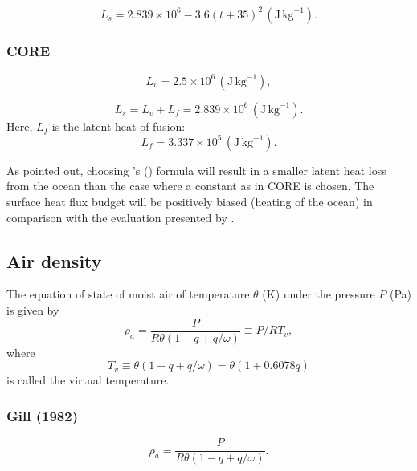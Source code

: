 \documentclass[dvipdfmx]{elsarticle_mod}
\begin{document}
\begin{equation}
   L_s = 2.839 \times 10^{6} - 3.6 (t + 35)^{2} \, (\mathrm{J}\,\mathrm{kg}^{-1}).
   \label{ch10-lasbl} 
\end{equation}

\subsubsection{CORE}

\begin{equation}
   L_v=2.5\times10^{6} \,(\mathrm{J}\,\mathrm{kg}^{-1}),
\end{equation}

\begin{equation}
   L_s=L_v+L_f=2.839\times10^{6} \,(\mathrm{J}\,\mathrm{kg}^{-1}).
\end{equation}
Here, $L_f$ is the latent heat of fusion:
\begin{equation}
   L_f = 3.337 \times 10^{5}  \,(\mathrm{J}\,\mathrm{kg}^{-1}).
\end{equation}

As \citet{Brodeau_et_al_2010} pointed out, choosing \citeauthor{Gill_1982}'s (\citeyear{Gill_1982}) formula will result in a smaller latent heat loss from the ocean than the case where a constant as in CORE is chosen. The surface heat flux budget will be positively biased (heating of the ocean) in comparison with the evaluation presented by \citet{Large_and_Yeager_2009}.


\subsection{Air density}

The equation of state of moist air of temperature $\theta$ (K) under the pressure $P$ (Pa) is given by
\begin{equation}
\rho_{a} = \frac{P}{R\theta(1-q+q/\omega)} \equiv P/R T_v,
\end{equation}
where
\begin{equation}
T_v \equiv \theta(1-q+q/\omega) = \theta (1+0.6078q)
\end{equation}
is called the virtual temperature.

\subsubsection{Gill (1982)}

\begin{equation}
\rho_{a} = \frac{P}{R\theta(1-q+q/\omega)}.
\end{equation}
\end{document}
